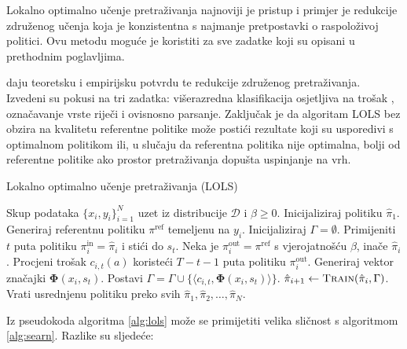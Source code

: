 Lokalno optimalno učenje pretraživanja 
najnoviji je pristup i primjer je redukcije združenog učenja koja je
konzistentna s najmanje pretpostavki o raspoloživoj politici. Ovu metodu moguće je
koristiti za sve zadatke koji su opisani u prethodnim poglavljima.

\cite{daume15lols} daju teoretsku i empirijsku potvrdu te redukcije združenog
pretraživanja. Izvedeni su pokusi na tri zadatka: višerazredna klasifikacija
osjetljiva na trošak ,
označavanje vrste riječi i ovisnosno parsanje. Zaključak je da algoritam
\textsc{LOLS} bez obzira na kvalitetu referentne politike može postići rezultate
koji su usporedivi s optimalnom politikom ili, u slučaju da referentna politika nije
optimalna, bolji od referentne politike ako prostor pretraživanja dopušta
uspinjanje na vrh.

\begin{algorithm}
\caption{Lokalno optimalno učenje pretraživanja (\textsc{LOLS})}\label{alg:lols}
\begin{algorithmic}[1]
\Require Skup podataka $\{x_i, y_i\}_{i=1}^N$ uzet iz distribucije $\mathcal{D}$
         i $\beta \geq 0$. %
\State Inicijaliziraj politiku $\hat{\pi}_1$.
  \State Generiraj referentnu politiku $\pi^{\text{ref}}$ temeljenu na $y_i$.
  \State Inicijaliziraj $\Gamma = \emptyset$. 
    \State Primijeniti $t$ puta politiku $\pi_{i}^{\text{in}} = \hat{\pi}_i$  i stići do $s_t$.  \label{alg:lols:learned}
      \State Neka je  $\pi_{i}^{\text{out}} = \pi^{\text{ref}}$ s vjerojatnošću $\beta$, inače $\hat{\pi}_i$.
      \State Procjeni trošak $c_{i,t}(a)$ koristeći $T-t-1$ puta politiku $\pi_{i}^{\text{out}}$.  \label{alg:lols:mixture}
    \EndFor
    \State Generiraj vektor značajki $\mathbf{\Phi}(x_i, s_t)$.
    \State Postavi $\Gamma = \Gamma \cup \{\langle c_{i,t}, \mathbf{\Phi}(x_i, s_t) \rangle\}$.
  \EndFor
  \State $\hat{\pi}_{i+1} \gets \textsc{Train}(\hat{\pi}_i, \Gamma)$.
\EndFor
\State Vrati usrednjenu politiku preko svih $\hat{\pi}_1, \hat{\pi}_2, \ldots, \hat{\pi}_N$.
\end{algorithmic}
\end{algorithm}

Iz pseudokoda algoritma \ref{alg:lols} može se primijetiti velika sličnost s
algoritmom \ref{alg:searn}. Razlike su sljedeće:

